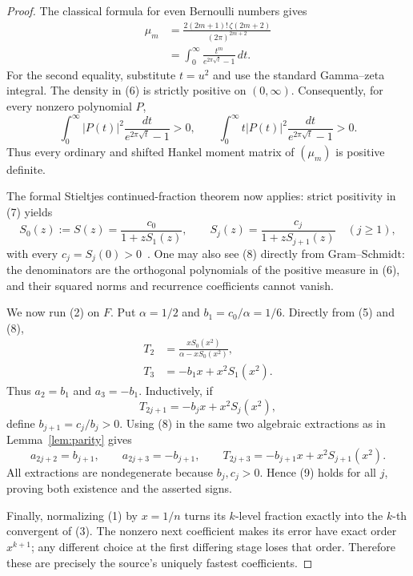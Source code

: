 \documentclass[11pt]{article}
\begin{document}
\begin{proof}
The classical formula for even Bernoulli numbers gives
\begin{align*}
 \mu_m
 &=\frac{2(2m+1)!\,\zeta(2m+2)}{(2\pi)^{2m+2}}\\
 &=\int_0^\infty
    \frac{t^m}{e^{2\pi\sqrt t}-1}\,dt.                    \tag{6}
\end{align*}
For the second equality, substitute \(t=u^2\) and use the standard Gamma--zeta
integral.  The density in (6) is strictly positive on \((0,\infty)\).
Consequently, for every nonzero polynomial \(P\),
\[
 \int_0^\infty |P(t)|^2\frac{dt}{e^{2\pi\sqrt t}-1}>0,
 \qquad
 \int_0^\infty t|P(t)|^2\frac{dt}{e^{2\pi\sqrt t}-1}>0.  \tag{7}
\]
Thus every ordinary and shifted Hankel moment matrix of \((\mu_m)\) is
positive definite.

The formal Stieltjes continued-fraction theorem now applies: strict positivity
in (7) yields
\[
 S_0(z):=S(z)=\frac{c_0}{1+zS_1(z)},
 \qquad
 S_j(z)=\frac{c_j}{1+zS_{j+1}(z)}\quad(j\geq1),            \tag{8}
\]
with every \(c_j=S_j(0)>0\)~\cite[Ch.~3]{Wall}.  One may also see (8)
directly from Gram--Schmidt: the denominators are the orthogonal polynomials
of the positive measure in (6), and their squared norms and recurrence
coefficients cannot vanish.

We now run (2) on \(F\).  Put \(\alpha=1/2\) and
\(b_1=c_0/\alpha=1/6\).  Directly from (5) and (8),
\begin{align*}
 T_2&=\frac{xS_0(x^2)}{\alpha-xS_0(x^2)},\\
 T_3&=-b_1x+x^2S_1(x^2).
\end{align*}
Thus \(a_2=b_1\) and \(a_3=-b_1\).  Inductively, if
\[
 T_{2j+1}=-b_jx+x^2S_j(x^2),
\]
define \(b_{j+1}=c_j/b_j>0\).  Using (8) in the same two algebraic
extractions as in Lemma~\ref{lem:parity} gives
\[
 a_{2j+2}=b_{j+1},
 \qquad a_{2j+3}=-b_{j+1},
 \qquad
 T_{2j+3}=-b_{j+1}x+x^2S_{j+1}(x^2).                      \tag{9}
\]
All extractions are nondegenerate because \(b_j,c_j>0\).  Hence (9) holds for
all \(j\), proving both existence and the asserted signs.

Finally, normalizing (1) by \(x=1/n\) turns its \(k\)-level fraction exactly
into the \(k\)-th convergent of (3).  The nonzero next coefficient makes its
error have exact order \(x^{k+1}\); any different choice at the first differing
stage loses that order.  Therefore these are precisely the source's uniquely
fastest coefficients.
\end{proof}
\end{document}

